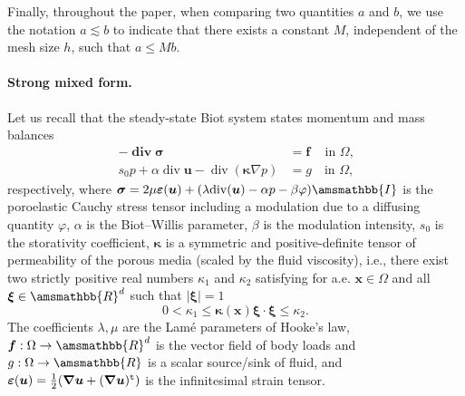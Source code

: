 \documentclass[fleqn,a4paper]{cas-sc}
\newcommand\vdiv{\mathop{\mathrm{div}}\nolimits}
\newcommand\bdiv{\mathop{\mathbf{div}}\nolimits}
\newcommand{\beps}{\boldsymbol{\varepsilon}}
\newcommand{\bbR}{\amsmathbb{R}}
\newcommand\RR{\bbR}
\newcommand{\Om}{\Omega}
\newcommand{\bu}{\boldsymbol{u}}
\newcommand{\bx}{\boldsymbol{x}}
\newcommand{\ff}{\boldsymbol{f}}
\newcommand{\bnabla}{\boldsymbol{\nabla}}
\newcommand{\bkappa}{\boldsymbol{\kappa}}
\newcommand{\bxi}{\boldsymbol{\xi}}
\newcommand{\0}{\boldsymbol{0}}
\newcommand\bbI{\amsmathbb{I}}
\newcommand\bsigma{\boldsymbol{\sigma}}
\numberwithin{equation}{section}
\numberwithin{figure}{section}
\begin{document}
Finally, throughout the paper, when comparing two quantities $a$ and $b$, we use the notation $a \lesssim b$ to indicate that there exists a constant $M$, independent of the mesh size $h$, such that $a \leq M b$. 



\paragraph{Strong mixed form.} Let us recall that the steady-state Biot system states momentum and mass balances 
\begin{align*}
    -\bdiv \bsigma  &= \ff   \quad \, \text{in $\Omega $,}  \\
       s_0 {p}+\alpha\vdiv \bu - \vdiv \left(\bkappa \nabla p \right) &= g \quad \text{in $\Omega $,}  
\end{align*}
respectively, where $\bsigma= 2\mu \beps(\bu) + (\lambda \mathrm{div}(\bu)- \alpha p - \beta \varphi) \bbI$ is the poroelastic Cauchy stress tensor including a modulation due to a diffusing quantity $\varphi$, $\alpha$ is the Biot--Willis parameter, $\beta$ is the modulation intensity, $s_0$ is the storativity coefficient,   $\bkappa$ is a symmetric and positive-definite tensor of permeability of the porous media (scaled by the fluid viscosity), i.e., there exist two strictly positive real numbers $\kappa_1$ and $\kappa_2$ satisfying for a.e. $\bx\in \Om$ and all $\bxi\in \bbR^d$ such that $|\bxi|=1$
\begin{equation*}
	0<\kappa_1\leq \bkappa(\bx)\bxi\cdot \bxi\leq \kappa_2.
\end{equation*}
The coefficients $\lambda,\mu$ are the Lam\'e parameters of Hooke's law, $\ff:\Omega \to \RR^d$ is the vector field of body loads and $g:\Omega\to \RR$ is a scalar source/sink of fluid, and $\beps(\bu)= \frac12(\bnabla \bu+(\bnabla\bu)^{\tt t})$ is the infinitesimal strain tensor. 
 
\end{document}
